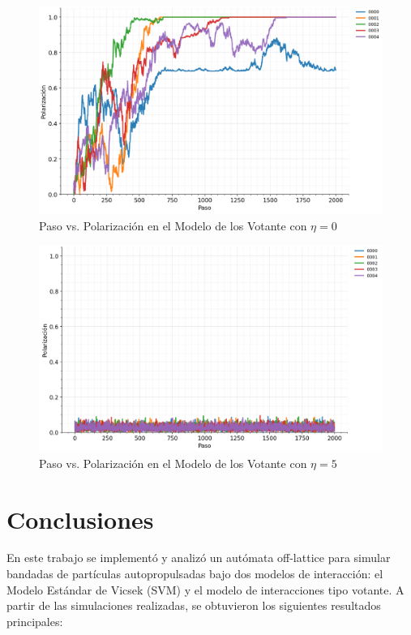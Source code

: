 \documentclass{article}
\begin{document}
\begin{figure} [H]
    \centering
    \includegraphics[width=1\linewidth]{noise_0_VM.png}
    \caption{Paso vs. Polarización en el Modelo de los Votante con \(\eta =0\)}
    \label{fig:placeholder}
\end{figure}
\begin{figure} [H]
    \centering
    \includegraphics[width=1\linewidth]{noise_5_VM.png}
    \caption{Paso vs. Polarización en el Modelo de los Votante con \(\eta =5\)}
    \label{fig:placeholder}
\end{figure}

\section{Conclusiones}

En este trabajo se implementó y analizó un autómata off-lattice para simular bandadas de partículas autopropulsadas bajo dos modelos de interacción: el Modelo Estándar de Vicsek (SVM) y el modelo de interacciones tipo votante. A partir de las simulaciones realizadas, se obtuvieron los siguientes resultados principales:
\end{document}
